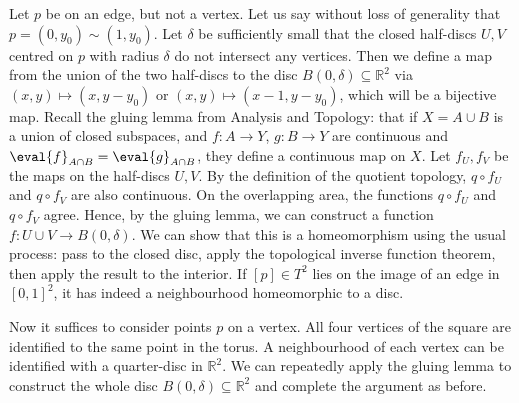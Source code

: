 \begin{example}
\begin{example}
		Let $p$ be on an edge, but not a vertex.
		Let us say without loss of generality that $p = (0,y_0) \sim (1,y_0)$.
		Let $\delta$ be sufficiently small that the closed half-discs $U, V$ centred on $p$ with radius $\delta$ do not intersect any vertices.
		Then we define a map from the union of the two half-discs to the disc $B(0,\delta) \subseteq \mathbb R^2$ via $(x,y) \mapsto (x,y-y_0)$ or $(x,y) \mapsto (x-1,y-y_0)$, which will be a bijective map.
		Recall the gluing lemma from Analysis and Topology: that if $X = A \cup B$ is a union of closed subspaces, and $f : A \to Y$, $g : B \to Y$ are continuous and $\eval{f}_{A \cap B} = \eval{g}_{A \cap B}$, they define a continuous map on $X$.
		Let $f_U, f_V$ be the maps on the half-discs $U, V$.
		By the definition of the quotient topology, $q \circ f_U$ and $q \circ f_V$ are also continuous.
		On the overlapping area, the functions $q \circ f_U$ and $q \circ f_V$ agree.
		Hence, by the gluing lemma, we can construct a function $f : U \cup V \to B(0, \delta)$.
		We can show that this is a homeomorphism using the usual process: pass to the closed disc, apply the topological inverse function theorem, then apply the result to the interior.
		If $[p] \in T^2$ lies on the image of an edge in $[0,1]^2$, it has indeed a neighbourhood homeomorphic to a disc.

		Now it suffices to consider points $p$ on a vertex.
		All four vertices of the square are identified to the same point in the torus.
		A neighbourhood of each vertex can be identified with a quarter-disc in $\mathbb R^2$.
		We can repeatedly apply the gluing lemma to construct the whole disc $B(0,\delta) \subseteq \mathbb R^2$ and complete the argument as before.


\end{example}
\end{example}
